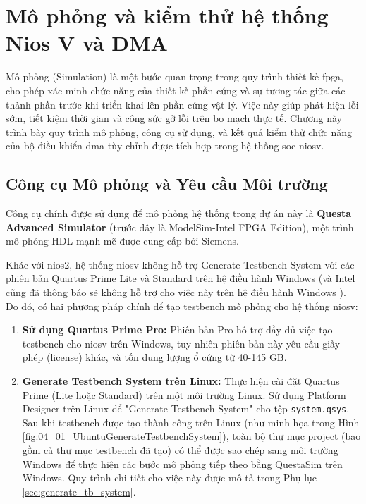 \chapter{Mô phỏng và kiểm thử hệ thống Nios V và DMA}
\label{Chapter4}

Mô phỏng (Simulation) là một bước quan trọng trong quy trình thiết kế \acrshort{fpga}, cho phép xác minh chức năng của thiết kế phần cứng và sự tương tác giữa các thành phần trước khi triển khai lên phần cứng vật lý. Việc này giúp phát hiện lỗi sớm, tiết kiệm thời gian và công sức gỡ lỗi trên bo mạch thực tế. Chương này trình bày quy trình mô phỏng, công cụ sử dụng, và kết quả kiểm thử chức năng của bộ điều khiển \acrshort{dma} tùy chỉnh được tích hợp trong hệ thống \acrshort{soc} \acrlong{niosv}.

\section{Công cụ Mô phỏng và Yêu cầu Môi trường}

Công cụ chính được sử dụng để mô phỏng hệ thống trong dự án này là \textbf{Questa Advanced Simulator} (trước đây là ModelSim-Intel FPGA Edition), một trình mô phỏng HDL mạnh mẽ được cung cấp bởi Siemens.

Khác với \acrshort{nios2}, hệ thống \acrshort{niosv} không hỗ trợ Generate Testbench System với các phiên bản Quartus Prime Lite và Standard trên hệ điều hành Windows (và Intel cũng đã thông báo sẽ không hỗ trợ cho việc này trên hệ điều hành Windows \cite{intel-forum-simulation}). Do đó, có hai phương pháp chính để tạo testbench mô phỏng cho hệ thống \acrshort{niosv}:

\begin{enumerate}
    \item \textbf{Sử dụng Quartus Prime Pro:} Phiên bản Pro hỗ trợ đầy đủ việc tạo testbench cho \acrshort{niosv} trên Windows, tuy nhiên phiên bản này yêu cầu giấy phép (license) khác, và tốn dung lượng ổ cứng từ 40-145 GB.
    \item \textbf{Generate Testbench System trên Linux:} Thực hiện cài đặt Quartus Prime (Lite hoặc Standard) trên một môi trường Linux. Sử dụng Platform Designer trên Linux để "Generate Testbench System" cho tệp \texttt{system.qsys}. Sau khi testbench được tạo thành công trên Linux (như minh họa trong Hình \ref{fig:04_01_UbuntuGenerateTestbenchSystem}), toàn bộ thư mục project (bao gồm cả thư mục testbench đã tạo) có thể được sao chép sang môi trường Windows để thực hiện các bước mô phỏng tiếp theo bằng QuestaSim trên Windows. Quy trình chi tiết cho việc này được mô tả trong Phụ lục \ref{sec:generate_tb_system}.
\end{enumerate}

